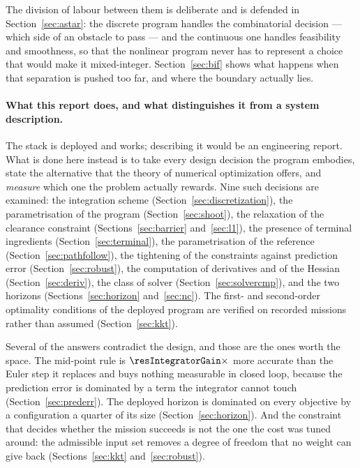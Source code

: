 \documentclass[11pt,a4paper]{article}
\begin{document}
The division of labour between them is deliberate and is defended in Section~\ref{sec:astar}: the discrete
program handles the combinatorial decision --- which side of an obstacle to pass --- and the continuous one
handles feasibility and smoothness, so that the nonlinear program never has to represent a choice that would
make it mixed-integer. Section~\ref{sec:bif} shows what happens when that separation is pushed too far, and
where the boundary actually lies.

\paragraph{What this report does, and what distinguishes it from a system description.}
The stack is deployed and works; describing it would be an engineering report. What is done here instead is
to take every design decision the program embodies, state the alternative that the theory of numerical
optimization offers, and \emph{measure} which one the problem actually rewards. Nine such decisions are
examined: the integration scheme (Section~\ref{sec:discretization}), the parametrisation of the program
(Section~\ref{sec:shoot}), the relaxation of the clearance constraint (Sections~\ref{sec:barrier}
and~\ref{sec:l1}), the presence of terminal ingredients (Section~\ref{sec:terminal}), the parametrisation of
the reference (Section~\ref{sec:pathfollow}), the tightening of the constraints against prediction error
(Section~\ref{sec:robust}), the computation of derivatives and of the Hessian (Section~\ref{sec:deriv}), the
class of solver (Section~\ref{sec:solvercmp}), and the two horizons (Sections~\ref{sec:horizon}
and~\ref{sec:nc}). The first- and second-order optimality conditions of the deployed program are verified on
recorded missions rather than assumed (Section~\ref{sec:kkt}).

Several of the answers contradict the design, and those are the ones worth the space. The mid-point rule is
$\resIntegratorGain\times$ more accurate than the Euler step it replaces and buys nothing measurable in
closed loop, because the prediction error is dominated by a term the integrator cannot touch
(Section~\ref{sec:prederr}). The deployed horizon is dominated on every objective by a configuration a
quarter of its size (Section~\ref{sec:horizon}). And the constraint that decides whether the mission succeeds
is not the one the cost was tuned around: the admissible input set removes a degree of freedom that no
weight can give back (Sections~\ref{sec:kkt} and~\ref{sec:robust}).
\end{document}
